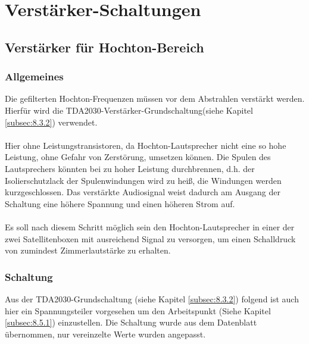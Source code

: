 
\section{Verstärker-Schaltungen}


\subsection{Verstärker für Hochton-Bereich}\label{subsec:5.1}
\subsubsection{Allgemeines}\label{subsec:5.1.1}
Die gefilterten Hochton-Frequenzen müssen vor dem Abstrahlen verstärkt werden.
Hierfür wird die TDA2030-Verstärker-Grundschaltung(siehe Kapitel \ref{subsec:8.3.2}) verwendet.
\\ \\
Hier ohne Leistungstransistoren, da Hochton-Lautsprecher nicht eine so hohe Leistung, ohne Gefahr von Zerstörung, umsetzen können.
Die Spulen des Lautsprechers könnten bei zu hoher Leistung durchbrennen, d.h. der Isolierschutzlack der Spulenwindungen wird zu heiß, die Windungen werden kurzgeschlossen.
Das verstärkte Audiosignal weist dadurch am Ausgang der Schaltung eine höhere Spannung und einen höheren Strom auf.
\\ \\
Es soll nach diesem Schritt möglich sein den Hochton-Lautsprecher in einer der zwei Satellitenboxen mit ausreichend Signal zu versorgen, um einen Schalldruck von zumindest Zimmerlautstärke zu erhalten. 

\newpage
\subsubsection{Schaltung}\label{subsec:5.1.2}
Aus der TDA2030-Grundschaltung (siehe Kapitel \ref{subsec:8.3.2}) folgend ist auch hier ein Spannungsteiler vorgesehen um den Arbeitspunkt (Siehe Kapitel \ref{subsec:8.5.1}) einzustellen.
Die Schaltung wurde aus dem Datenblatt übernommen, nur vereinzelte Werte wurden angepasst. 


